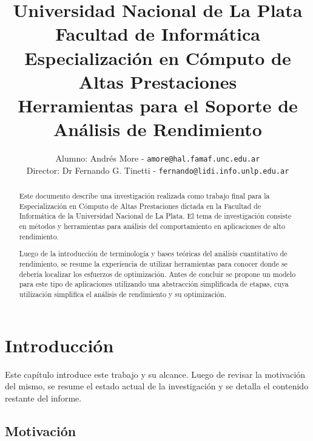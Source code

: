 \documentclass[a4paper]{report}
\begin{document}
\title{
  Universidad Nacional de La Plata\\Facultad de Inform\'atica\\
  \bigskip
  Especializaci\'on en C\'omputo de Altas Prestaciones\\
  \bigskip
  Herramientas para el Soporte de An\'alisis de Rendimiento
}

\author{
  Alumno: Andr\'es More - {\tt amore@hal.famaf.unc.edu.ar}\\
  Director: Dr Fernando G. Tinetti - {\tt fernando@lidi.info.unlp.edu.ar}
}


\maketitle

\begin{abstract}

  \bigskip

  Este documento describe una investigaci\'on realizada como trabajo final para
  la Especializaci\'on en C\'omputo de Altas Prestaciones dictada en la
  Facultad   de Inform\'atica de la Universidad Nacional de La Plata.
  El tema de investigaci\'on consiste en m\'etodos y herramientas para
  an\'alisis del comportamiento en aplicaciones de alto rendimiento.

  \bigskip

  Luego de la introducci\'on de terminolog\'ia y bases te\'oricas del
  an\'alisis cuantitativo de rendimiento, se resume la experiencia de utilizar
  herramientas para conocer donde se deber\'ia localizar los esfuerzos de
  optimizaci\'on. Antes de concluir se propone un modelo para este tipo de
  aplicaciones utilizando una abstracci\'on simplificada de etapas, cuya
  utilizaci\'on simplifica el an\'alisis de rendimiento y su optimizaci\'on.

\end{abstract}

\tableofcontents

\chapter{Introducci\'on}

Este cap\'itulo introduce este trabajo y su alcance. Luego de revisar la
motivaci\'on del mismo, se resume el estado actual de la investigaci\'on y se
detalla el contenido restante del informe.

\section{Motivaci\'on}
\end{document}
